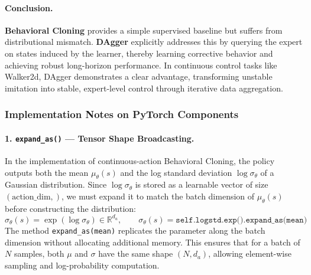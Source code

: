 \documentclass[12pt]{article}
\begin{document}
\paragraph{Conclusion.}
\textbf{Behavioral Cloning} provides a simple supervised baseline but suffers from distributional mismatch.  
\textbf{DAgger} explicitly addresses this by querying the expert on states induced by the learner, 
thereby learning corrective behavior and achieving robust long-horizon performance.  
In continuous control tasks like Walker2d, DAgger demonstrates a clear advantage, 
transforming unstable imitation into stable, expert-level control through iterative data aggregation.

\subsubsection*{Implementation Notes on PyTorch Components}

\paragraph{1. \texttt{expand\_as()} — Tensor Shape Broadcasting.}
In the implementation of continuous-action Behavioral Cloning, the policy outputs both
the mean $\mu_\theta(s)$ and the log standard deviation $\log \sigma_\theta$ of a Gaussian distribution.
Since $\log \sigma_\theta$ is stored as a learnable vector of size $(\text{action\_dim},)$,
we must expand it to match the batch dimension of $\mu_\theta(s)$ before constructing the distribution:
\[
\sigma_\theta(s) = \exp(\log \sigma_\theta) \in \mathbb{R}^{d_a}, \qquad 
\sigma_\theta(s) = \texttt{self.logstd.exp().expand\_as(mean)}
\]
The method \texttt{expand\_as(mean)} replicates the parameter along the batch dimension
without allocating additional memory.  
This ensures that for a batch of $N$ samples, both $\mu$ and $\sigma$ have the same shape $(N, d_a)$,
allowing element-wise sampling and log-probability computation.
\end{document}
